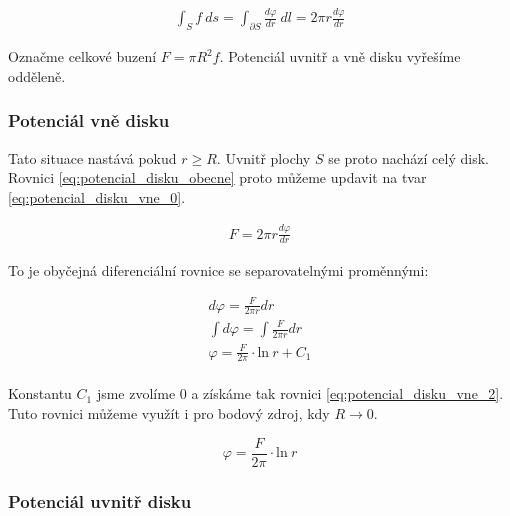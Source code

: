 \documentclass{book}
\begin{document}
\begin{equation}
\label{eq:potencial_disku_obecne}
\begin{split}
\int_S f \ ds = \int_{\partial S} \frac{d \varphi}{dr} \ dl = 2 \pi r \frac{d \varphi}{dr}
\end{split}
\end{equation}

Označme celkové buzení \(F = \pi R^2 f\).
Potenciál uvnitř a vně disku vyřešíme odděleně.

\subsubsection{Potenciál vně disku}

Tato situace nastává pokud \(r \geq R\). Uvnitř plochy \(S\) se proto nachází celý disk. Rovnici \eqref{eq:potencial_disku_obecne} proto můžeme updavit na tvar \eqref{eq:potencial_disku_vne_0}.

\begin{equation}
\label{eq:potencial_disku_vne_0}
\begin{split}
F = 2 \pi r \frac{d \varphi}{dr}
\end{split}
\end{equation}

To je obyčejná diferenciální rovnice se separovatelnými proměnnými:

\begin{equation}
\label{eq:potencial_disku_vne_1}
\begin{split}
d \varphi = \frac{F}{2 \pi r} dr \\
\int d \varphi = \int \frac{F}{2 \pi r} dr \\
\varphi = \frac{F}{2 \pi} \cdot \mathrm{ln} \ r + C_1 \\
\end{split}
\end{equation}

Konstantu \(C_1\) jsme zvolíme 0 a získáme tak rovnici \eqref{eq:potencial_disku_vne_2}. Tuto rovnici můžeme využít i pro bodový zdroj, kdy \(R \rightarrow 0\).

\begin{equation}
\label{eq:potencial_disku_vne_2}
\varphi = \frac{F}{2 \pi} \cdot \mathrm{ln} \ r
\end{equation}

\subsubsection{Potenciál uvnitř disku}
\end{document}
